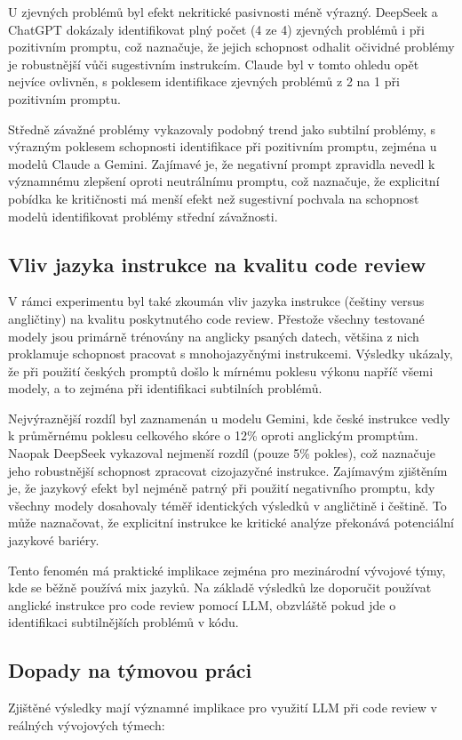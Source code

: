 \documentclass[12pt, a4paper]{article}
\begin{document}
U zjevných problémů byl efekt nekritické pasivnosti méně výrazný. DeepSeek a ChatGPT dokázaly identifikovat plný počet (4 ze 4) zjevných problémů i při pozitivním promptu, což naznačuje, že jejich schopnost odhalit očividné problémy je robustnější vůči sugestivním instrukcím. Claude byl v tomto ohledu opět nejvíce ovlivněn, s poklesem identifikace zjevných problémů z 2 na 1 při pozitivním promptu.

Středně závažné problémy vykazovaly podobný trend jako subtilní problémy, s výrazným poklesem schopnosti identifikace při pozitivním promptu, zejména u modelů Claude a Gemini. Zajímavé je, že negativní prompt zpravidla nevedl k významnému zlepšení oproti neutrálnímu promptu, což naznačuje, že explicitní pobídka ke kritičnosti má menší efekt než sugestivní pochvala na schopnost modelů identifikovat problémy střední závažnosti.

\subsection{Vliv jazyka instrukce na kvalitu code review}
V rámci experimentu byl také zkoumán vliv jazyka instrukce (češtiny versus angličtiny) na kvalitu poskytnutého code review. Přestože všechny testované modely jsou primárně trénovány na anglicky psaných datech, většina z nich proklamuje schopnost pracovat s mnohojazyčnými instrukcemi. Výsledky ukázaly, že při použití českých promptů došlo k mírnému poklesu výkonu napříč všemi modely, a to zejména při identifikaci subtilních problémů.

Nejvýraznější rozdíl byl zaznamenán u modelu Gemini, kde české instrukce vedly k průměrnému poklesu celkového skóre o 12\% oproti anglickým promptům. Naopak DeepSeek vykazoval nejmenší rozdíl (pouze 5\% pokles), což naznačuje jeho robustnější schopnost zpracovat cizojazyčné instrukce. Zajímavým zjištěním je, že jazykový efekt byl nejméně patrný při použití negativního promptu, kdy všechny modely dosahovaly téměř identických výsledků v angličtině i češtině. To může naznačovat, že explicitní instrukce ke kritické analýze překonává potenciální jazykové bariéry.

Tento fenomén má praktické implikace zejména pro mezinárodní vývojové týmy, kde se běžně používá mix jazyků. Na základě výsledků lze doporučit používat anglické instrukce pro code review pomocí LLM, obzvláště pokud jde o identifikaci subtilnějších problémů v kódu.

\subsection{Dopady na týmovou práci}
Zjištěné výsledky mají významné implikace pro využití LLM při code review v reálných vývojových týmech:
\end{document}

